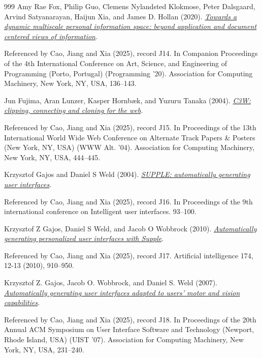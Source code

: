 \documentclass[11pt,letterpaper]{article}
\begin{document}
\begin{thebibliography}{999}
Amy Rae Fox, Philip Guo, Clemens Nylandsted Klokmose, Peter Dalsgaard, Arvind Satyanarayan, Haijun Xia, and James D. Hollan (2020).
\href{https://doi.org/10.1145/3397537.3397542}{\emph{Towards a dynamic multiscale personal information space: beyond application and document centered views of information}}.
\par {\small Referenced by Cao, Jiang and Xia (2025), record J14. In Companion Proceedings of the 4th International Conference on Art, Science, and Engineering of Programming (Porto, Portugal) (Programming ’20). Association for Computing Machinery, New York, NY, USA, 136–143.}

Jun Fujima, Aran Lunzer, Kasper Hornbæk, and Yuzuru Tanaka (2004).
\href{https://doi.org/10.1145/1013367.1013517}{\emph{C3W: clipping, connecting and cloning for the web}}.
\par {\small Referenced by Cao, Jiang and Xia (2025), record J15. In Proceedings of the 13th International World Wide Web Conference on Alternate Track Papers \& Posters (New York, NY, USA) (WWW Alt. ’04). Association for Computing Machinery, New York, NY, USA, 444–445.}

Krzysztof Gajos and Daniel S Weld (2004).
\href{https://www.eecs.harvard.edu/~kgajos/papers/2004/gajos04supple.shtml}{\emph{SUPPLE: automatically generating user interfaces}}.
\par {\small Referenced by Cao, Jiang and Xia (2025), record J16. In Proceedings of the 9th international conference on Intelligent user interfaces. 93–100.}

Krzysztof Z Gajos, Daniel S Weld, and Jacob O Wobbrock (2010).
\href{https://www.iis.seas.harvard.edu/papers/2010/gajos10automatically.shtml}{\emph{Automatically generating personalized user interfaces with Supple}}.
\par {\small Referenced by Cao, Jiang and Xia (2025), record J17. Artificial intelligence 174, 12-13 (2010), 910–950.}

Krzysztof Z. Gajos, Jacob O. Wobbrock, and Daniel S. Weld (2007).
\href{https://doi.org/10.1145/1294211.1294253}{\emph{Automatically generating user interfaces adapted to users’ motor and vision capabilities}}.
\par {\small Referenced by Cao, Jiang and Xia (2025), record J18. In Proceedings of the 20th Annual ACM Symposium on User Interface Software and Technology (Newport, Rhode Island, USA) (UIST ’07). Association for Computing Machinery, New York, NY, USA, 231–240.}


\end{thebibliography}
\end{document}
